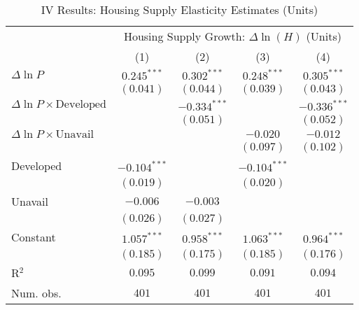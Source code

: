 
\begin{table}
\caption{IV Results: Housing Supply Elasticity Estimates (Units)}
\begin{center}
\begin{normalsize}
\begin{threeparttable}
\begin{tabular}{l@{} c@{} c@{} c@{} c@{}}
\toprule
 & \multicolumn{4}{c}{Housing Supply Growth: $\Delta\ln(H)$ (Units)} \\
\cmidrule(lr){2-5}
 & (1) & (2) & (3) & (4) \\
\midrule
$\Delta\ln P$                         & $0.245^{***}$  & $0.302^{***}$  & $0.248^{***}$  & $0.305^{***}$  \\
                                      & $(0.041)$      & $(0.044)$      & $(0.039)$      & $(0.043)$      \\
$\Delta\ln P\times{\text{Developed}}$ &                & $-0.334^{***}$ &                & $-0.336^{***}$ \\
                                      &                & $(0.051)$      &                & $(0.052)$      \\
$\Delta\ln P\times{\text{Unavail}}$   &                &                & $-0.020$       & $-0.012$       \\
                                      &                &                & $(0.097)$      & $(0.102)$      \\
Developed                             & $-0.104^{***}$ &                & $-0.104^{***}$ &                \\
                                      & $(0.019)$      &                & $(0.020)$      &                \\
Unavail                               & $-0.006$       & $-0.003$       &                &                \\
                                      & $(0.026)$      & $(0.027)$      &                &                \\
Constant                              & $1.057^{***}$  & $0.958^{***}$  & $1.063^{***}$  & $0.964^{***}$  \\
                                      & $(0.185)$      & $(0.175)$      & $(0.185)$      & $(0.176)$      \\
\midrule
R$^2$                                 & $0.095$        & $0.099$        & $0.091$        & $0.094$        \\
Num. obs.                             & $401$          & $401$          & $401$          & $401$          \\

\end{tabular}
\end{threeparttable}
\end{normalsize}
\end{center}
\end{table}
